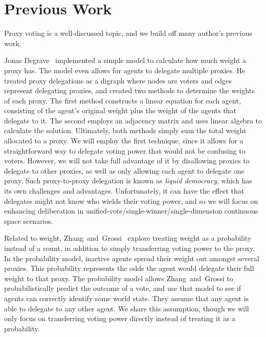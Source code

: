 \section{Previous Work}\label{sec:\chptindicator-previous-work}
Proxy voting is a well-discussed topic, and we build off many author's previous work.

Jonas Degrave~\cite{Degrave2014} implemented a simple model to calculate how much
weight a proxy has.
The model even allows for agents to delegate multiple proxies.
He treated proxy delegations as a digraph where nodes are voters and edges represent
delegating proxies, and created two methods to determine the weights of each proxy.
The first method constructs a linear equation for each agent, consisting of the
agent's original weight plus the weight of the agents that delegate to it.
The second employs an adjacency matrix and uses linear algebra to calculate the
solution.
Ultimately, both methods simply sum the total weight allocated to a proxy.
We will employ the first technique, since it allows for a straightforward way to
delegate voting power that would not be confusing to voters.
However, we will not take full advantage of it by disallowing proxies to delegate to
other proxies, as well as only allowing each agent to delegate one proxy.
Such proxy-to-proxy delegation is known as \textit{liquid democracy}, which has its own
challenges and advantages.
Unfortunately, it can have the effect that delegates might not know who wields their
voting power, and so we will focus on enhancing deliberation in
unified-vote/single-winner/single-dimension continuous space scenarios.

Related to weight, Zhang~and~Grossi~\cite{Zhang2022} explore treating weight as a
probability instead of a count, in addition to simply transferring voting power to
the proxy.
In the probability model, inactive agents spread their weight out amongst several
proxies.
This probability represents the odds the agent would delegate their full weight to that
proxy.
The probability model allows Zhang~and~Grossi to probabilistically predict the
outcome of a vote, and use that model to see if agents can correctly identify some
world state.
They assume that any agent is able to delegate to any other agent.
We share this assumption, though we will only focus on transferring voting power
directly instead of treating it as a probability.

